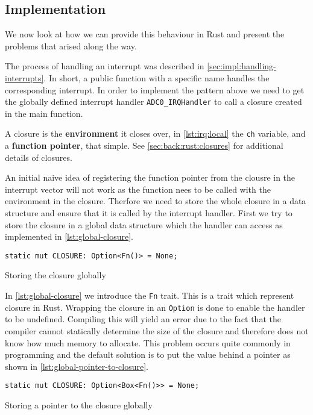 \subsection{Implementation}
We now look at how we can provide this behaviour in Rust and present the problems that arised along the way.

The process of handling an interrupt was described in \autoref{sec:impl:handling-interrupts}.
In short, a public function with a specific name handles the corresponding interrupt.
In order to implement the pattern above we need to get the globally defined interrupt handler \texttt{ADC0\_IRQHandler} to call a closure created in the main function.

A closure is the \textbf{environment} it closes over, in \autoref{lst:irq:local} the \texttt{ch} variable, and a \textbf{function pointer}, that simple.
See \autoref{sec:back:rust:closures} for additional details of closures.

An initial naive idea of registering the function pointer from the clousre in the interrupt vector will not work as the function nees to be called with the environment in the closure.
Therfore we need to store the whole closure in a data structure and ensure that it is called by the interrupt handler.
First we try to store the closure in a global data structure which the handler can access as implemented in \autoref{lst:global-closure}.

\begin{listing}[H]
  \begin{verbatim}
static mut CLOSURE: Option<Fn()> = None;
  \end{verbatim}
  \caption{Storing the closure globally}
  \label{lst:global-closure}
\end{listing}

In \autoref{lst:global-closure} we introduce the \texttt{Fn} trait.
This is a trait which represent closure in Rust.
Wrapping the closure in an \texttt{Option} is done to enable the handler to be undefined.
Compiling this will yield an error due to the fact that the compiler cannot statically determine the size of the closure and therefore does not know how much memory to allocate.
This problem occurs quite commonly in programming and the default solution is to put the value behind a pointer as shown in \autoref{lst:global-pointer-to-closure}.

\begin{listing}[H]
  \begin{verbatim}
static mut CLOSURE: Option<Box<Fn()>> = None;
  \end{verbatim}
  \caption{Storing a pointer to the closure globally}
  \label{lst:global-pointer-to-closure}
\end{listing}

